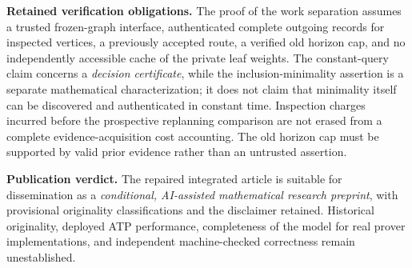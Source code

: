 \documentclass[11pt,letterpaper]{article}
\theoremstyle{definition}
\theoremstyle{remark}
\begin{document}
\textbf{Retained verification obligations.} The proof of the work separation assumes a trusted frozen-graph interface, authenticated complete outgoing records for inspected vertices, a previously accepted route, a verified old horizon cap, and no independently accessible cache of the private leaf weights. The constant-query claim concerns a \emph{decision certificate}, while the inclusion-minimality assertion is a separate mathematical characterization; it does not claim that minimality itself can be discovered and authenticated in constant time. Inspection charges incurred before the prospective replanning comparison are not erased from a complete evidence-acquisition cost accounting. The old horizon cap must be supported by valid prior evidence rather than an untrusted assertion.

\textbf{Publication verdict.} The repaired integrated article is suitable for dissemination as a \emph{conditional, AI-assisted mathematical research preprint}, with provisional originality classifications and the disclaimer retained. Historical originality, deployed ATP performance, completeness of the model for real prover implementations, and independent machine-checked correctness remain unestablished.
\end{document}
